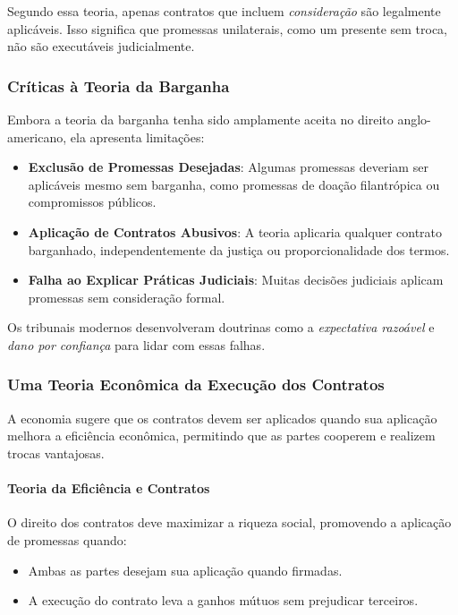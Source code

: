 \documentclass[a4paper,12pt]{article}[abntex2]
\begin{document}
Segundo essa teoria, apenas contratos que incluem \textit{consideração} são legalmente aplicáveis. Isso significa que promessas unilaterais, como um presente sem troca, não são executáveis judicialmente.

\subsubsection{Críticas à Teoria da Barganha}

Embora a teoria da barganha tenha sido amplamente aceita no direito anglo-americano, ela apresenta limitações:
\begin{itemize}
    \item \textbf{Exclusão de Promessas Desejadas}: Algumas promessas deveriam ser aplicáveis mesmo sem barganha, como promessas de doação filantrópica ou compromissos públicos.
    \item \textbf{Aplicação de Contratos Abusivos}: A teoria aplicaria qualquer contrato barganhado, independentemente da justiça ou proporcionalidade dos termos.
    \item \textbf{Falha ao Explicar Práticas Judiciais}: Muitas decisões judiciais aplicam promessas sem consideração formal.
\end{itemize}

Os tribunais modernos desenvolveram doutrinas como a \textit{expectativa razoável} e \textit{dano por confiança} para lidar com essas falhas.

\subsubsection{Uma Teoria Econômica da Execução dos Contratos}

A economia sugere que os contratos devem ser aplicados quando sua aplicação melhora a eficiência econômica, permitindo que as partes cooperem e realizem trocas vantajosas.

\paragraph{Teoria da Eficiência e Contratos}
O direito dos contratos deve maximizar a riqueza social, promovendo a aplicação de promessas quando:
\begin{itemize}
    \item Ambas as partes desejam sua aplicação quando firmadas.
    \item A execução do contrato leva a ganhos mútuos sem prejudicar terceiros.
\end{itemize}
\end{document}
